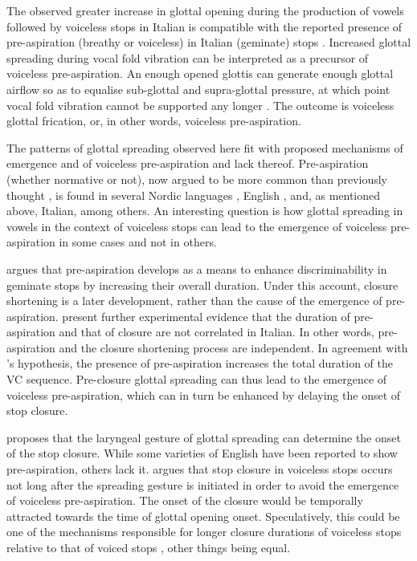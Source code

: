 \documentclass[
  11pt,
  a4paper,
]{article}
\begin{document}
The observed greater increase in glottal opening during the production
of vowels followed by voiceless stops in Italian is compatible with the
reported presence of pre-aspiration (breathy or voiceless) in Italian
(geminate) stops
\citep{ni-chasaide1993, stevens2004a, stevens2004, stevens2010, stevens2010b, stevens2014a}.
Increased glottal spreading during vocal fold vibration can be
interpreted as a precursor of voiceless pre-aspiration. An enough opened
glottis can generate enough glottal airflow so as to equalise
sub-glottal and supra-glottal pressure, at which point vocal fold
vibration cannot be supported any longer
\citep{berg1958, rothenberg1967, ohala2011}. The outcome is voiceless
glottal frication, or, in other words, voiceless pre-aspiration.

The patterns of glottal spreading observed here fit with proposed
mechanisms of emergence and of voiceless pre-aspiration and lack
thereof. Pre-aspiration (whether normative or not), now argued to be
more common than previously thought \citep{helgason2002}, is found in
several Nordic languages \citep{helgason1999, helgason2002}, English
\citep{gordeeva2007, nance2013, hejna2015a}, and, as mentioned above,
Italian, among others. An interesting question is how glottal spreading
in vowels in the context of voiceless stops can lead to the emergence of
voiceless pre-aspiration in some cases and not in others.

\citep{nichasaide1985} argues that pre-aspiration develops as a means to
enhance discriminability in geminate stops by increasing their overall
duration. Under this account, closure shortening is a later development,
rather than the cause of the emergence of pre-aspiration.
\citet{stevens2014} present further experimental evidence that the
duration of pre-aspiration and that of closure are not correlated in
Italian. In other words, pre-aspiration and the closure shortening
process are independent. In agreement with \citeauthor{nichasaide1985}'s
hypothesis, the presence of pre-aspiration increases the total duration
of the VC sequence. Pre-closure glottal spreading can thus lead to the
emergence of voiceless pre-aspiration, which can in turn be enhanced by
delaying the onset of stop closure.

\citet{lisker1974} proposes that the laryngeal gesture of glottal
spreading can determine the onset of the stop closure. While some
varieties of English have been reported to show pre-aspiration, others
lack it. \citeauthor{lisker1974} argues that stop closure in voiceless
stops occurs not long after the spreading gesture is initiated in order
to avoid the emergence of voiceless pre-aspiration. The onset of the
closure would be temporally attracted towards the time of glottal
opening onset. Speculatively, this could be one of the mechanisms
responsible for longer closure durations of voiceless stops relative to
that of voiced stops
\citep{lisker1957, umeda1977, van-summers1987, davis1989, de-jong1991},
other things being equal.
\end{document}
